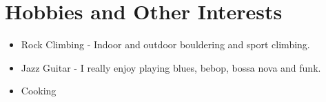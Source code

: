 \documentclass[letterpaper,12pt]{article}
\begin{document}
\section{Hobbies and Other Interests}
\begin{itemize}
	\item Rock Climbing - Indoor and outdoor bouldering and sport climbing. 
	\item Jazz Guitar - I really enjoy playing blues, bebop, bossa nova and funk. 
	\item Cooking 
\end{itemize}





%
%
%	
%	
\end{document}
